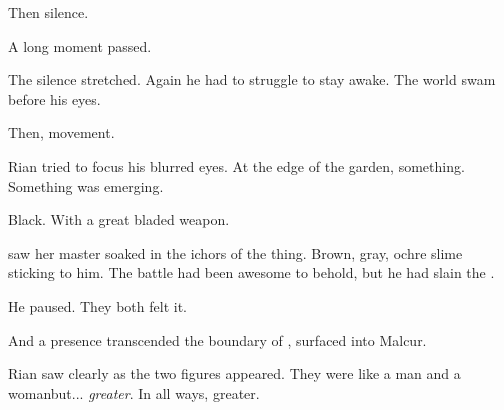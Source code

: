 Then silence. 

A long moment passed. 


The silence stretched. Again he had to struggle to stay awake. The world swam before his eyes. 

Then, movement. 

Rian tried to focus his blurred eyes. At the edge of the garden, something. Something was emerging. 

Black. With a great bladed weapon. 








\begin{comment}
\subsubsection{\Criseis}
\end{comment}
\new
\Criseis{} saw her master soaked in the ichors of the thing. Brown, gray, ochre slime sticking to him. The battle had been awesome to behold, but he had slain the \ghobal. 



He paused. 
They both felt it. 

And a presence transcended the boundary of \Nyx, surfaced into Malcur. 



\begin{comment}
\subsection{A god in the flesh}
\end{comment}

\begin{comment}
\subsubsection{Rian}
\end{comment}
\new
Rian saw clearly as the two figures appeared. 
They were like \humans{}\dash a man and a woman\dash but... \emph{greater}. In all ways, greater. 

